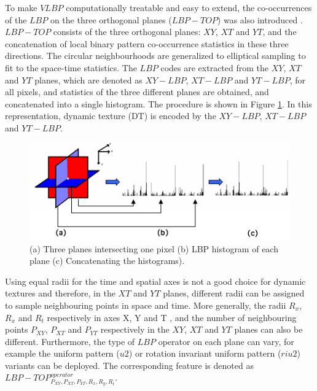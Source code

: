 To make $VLBP$ computationally treatable and easy to extend, the co-occurrences of the $LBP$ on the three orthogonal planes ($LBP-TOP$) was also introduced \cite{zhao2007dynamic}. $LBP-TOP$ consists of the three orthogonal planes: $XY$, $XT$ and $YT$, and the concatenation of local binary pattern co-occurrence statistics in these three directions. The circular neighbourhoods are generalized to elliptical sampling to fit to the space-time statistics. The $LBP$ codes are extracted from the $XY$, $XT$ and $YT$ planes, which are denoted as $XY-LBP$, $XT-LBP$ and $YT-LBP$, for all pixels, and statistics of the three different planes are obtained, and concatenated into a single histogram. The procedure is shown in Figure \ref{fig:LBP-TOP_design}. In this representation, dynamic texture (DT) is encoded by the  $XY-LBP$, $XT-LBP$ and $YT-LBP$.

\begin{figure}[!htb]
\begin{center}
\includegraphics [width=0.75\linewidth] {images/proposed_countermeasure/LBP-TOP_design.png}
\caption{(a) Three planes intersecting one pixel (b) LBP histogram of each plane (c) Concatenating the histograms).} \label{fig:LBP-TOP_design}
\end{center}
\end{figure}

Using equal radii for the time and spatial axes is not a good choice for dynamic textures \cite{zhao2007dynamic} and therefore, in the $XT$ and $YT$ planes, different radii can be assigned to sample neighbouring points in space and time. More generally, the radii $R_{x}$, $R_{x}$  and $R_{t}$ respectively in axes X, Y and T , and the number of neighbouring points $P_{XY}$, $P_{XT}$ and $P_{YT}$ respectively in the $XY$, $XT$ and $YT$ planes can also be different. Furthermore, the type of $LBP$ operator on each plane can vary, for example the uniform pattern ($u2$) or rotation invariant uniform pattern ($riu2$) variants \cite{pietikainen2011computer} can be deployed. The corresponding feature is denoted as $LBP-TOP_{P_{XY},P_{XT},P_{YT},R_{x},R_{y},R_{t}}^{operator}$.

